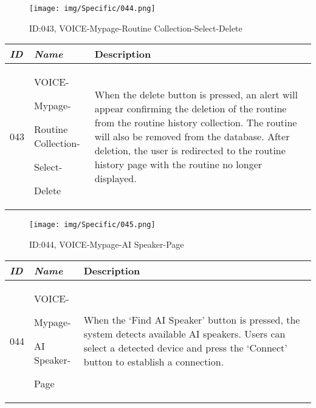 \documentclass[conference]{IEEEtran}
\begin{document}
\begin{enumerate}[label=\arabic*]
    \vspace{2em}

    \begin{figure}[h]
        \centering
        \texttt{[image: img/Specific/044.png]}
        \caption{ID:043, VOICE-Mypage-Routine Collection-Select-Delete}
    \end{figure}

    \begin{table}[h]
    \def\arraystretch{1.2} \small
        \begin{tabular}{|p{1cm}|p{1.8cm}|p{4.8cm}|}
        \hline
            \textit{\textbf{ID}} & \textit{\textbf{Name}} & {\textbf{Description}} \\
        \hline
            043 \par & VOICE-\par Mypage-\par Routine Collection-\par Select-\par Delete & When the delete button is pressed, an alert will appear confirming the deletion of the routine from the routine history collection. The routine will also be removed from the database. After deletion, the user is redirected to the routine history page with the routine no longer displayed. \\
        \hline
        \end{tabular}
    \end{table}

    \newpage

    \begin{figure}[h]
        \centering
        \texttt{[image: img/Specific/045.png]}
        \caption{ID:044, VOICE-Mypage-AI Speaker-Page}
    \end{figure}

    \begin{table}[h]
    \def\arraystretch{1.2} \small
        \begin{tabular}{|p{1cm}|p{1.8cm}|p{4.8cm}|}
        \hline
            \textit{\textbf{ID}} & \textit{\textbf{Name}} & {\textbf{Description}} \\
        \hline
            044 \par & VOICE-\par Mypage-\par AI Speaker-\par Page & When the ‘Find AI Speaker’ button is pressed, the system detects available AI speakers. Users can select a detected device and press the ‘Connect’ button to establish a connection. \\
        \hline
        \end{tabular}
    \end{table}


\end{enumerate}
\end{document}
